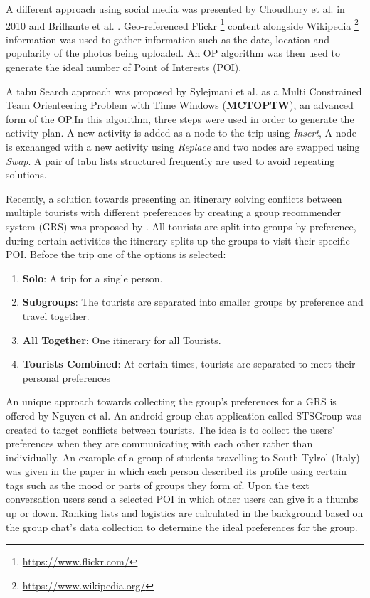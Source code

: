     A different approach using social media was presented by Choudhury
    et al. \cite{DeChoudhury2010} in 2010 and Brilhante et al.
    \cite{RamalhoBrilhante2014}. Geo-referenced Flickr
    \footnote{\url{https://www.flickr.com/}} content alongside
    Wikipedia \footnote{\url{https://www.wikipedia.org/}} information
    was used to gather information such as the date, location and
    popularity of the photos being uploaded. An OP algorithm was then
    used to generate the ideal number of Point of Interests (POI).

    A tabu Search approach was proposed by Sylejmani et al.
    \cite{Sylejmani2012} as a Multi Constrained Team Orienteering
    Problem with Time Windows (\textbf{MCTOPTW}), an advanced form of
    the OP.In this algorithm, three steps were used in order to
    generate the activity plan. A new activity is added as a node to
    the trip using \emph{Insert}, A node is exchanged with a new
    activity using \emph{Replace} and two nodes are swapped using
    \emph{Swap}. A pair of tabu lists structured frequently are used
    to avoid repeating solutions.


    Recently, a solution towards presenting an itinerary solving
    conflicts between multiple tourists with different preferences by
    creating a group recommender system (GRS)
    \cite{Castro2015,Delic2018} was proposed by  \cite{Sylejmani2017}.
    All tourists are split into groups by preference, during certain
    activities the itinerary splits up the groups to visit their
    specific POI. Before the trip one of the options is selected: 

    \begin{enumerate} 
        \item \textbf{Solo}: A trip for a single person. 
        \item \textbf{Subgroups}: The tourists are separated into smaller groups by preference and travel together.
        \item \textbf{All Together}: One itinerary for all Tourists.
        \item \textbf{Tourists Combined}: At certain times, tourists
    are separated to meet their personal preferences
    \end{enumerate}

    An unique approach towards collecting the group's preferences for
    a GRS is offered by Nguyen et al.\cite{Nguyen2018} An android
    group chat application called STSGroup was created to target
    conflicts between tourists. The idea is to collect the users’
    preferences when they are communicating with each other rather
    than individually. An example of a group of students travelling to
    South Tylrol (Italy) was given in the paper in which each person
    described its profile using certain tags such as the mood or parts
    of groups they form of. Upon the text conversation users send a
    selected POI in which other users can give it a thumbs up or down.
    Ranking lists and logistics are calculated in the background based
    on the group chat's data collection to determine the ideal
    preferences for the group.

